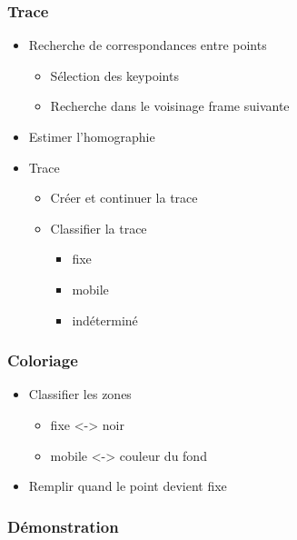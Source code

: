 \begin{frame}
  \frametitle{Trace}
  \begin{itemize}
  \item Recherche de correspondances entre points
  	\begin{itemize}
  	\item Sélection des keypoints
  	\item Recherche dans le voisinage frame suivante
  	\end{itemize}
  \item Estimer l'homographie
  \item Trace
  	\begin{itemize}
  	\item Créer et continuer la trace
  	\item Classifier la trace
  	\begin{itemize}
  		\item fixe
  		\item mobile
  		\item indéterminé
  	\end{itemize}
  	\end{itemize}
  \end{itemize}

\end{frame}



\begin{frame}
  \frametitle{Coloriage}
  
  \begin{itemize}
  \item Classifier les zones
  	\begin{itemize}
  	\item fixe <-> noir
  	\item mobile <-> couleur du fond
  	\end{itemize}
  \item Remplir quand le point devient fixe  
  \end{itemize}

\end{frame}


 \begin{frame}
   \frametitle{Démonstration}


 \end{frame}